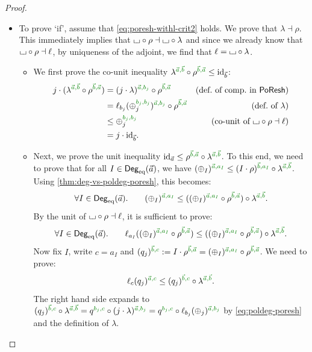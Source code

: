 \documentclass[a4paper]{memoir}
\begin{document}
\begin{proof}
\begin{enumerate}
\begin{itemize}
			\item To prove `if', assume that \cref{eq:poresh-withl-crit2} holds. We prove that $\lambda \dashv \rho$. This immediately implies that ${\llcorner\hspace{-.4ex}\lrcorner} \circ \rho \dashv {\llcorner\hspace{-.4ex}\lrcorner} \circ \lambda$ and since we already know that ${\llcorner\hspace{-.4ex}\lrcorner} \circ \rho \dashv \ell$, by uniqueness of the adjoint, we find that $\ell = {\llcorner\hspace{-.4ex}\lrcorner} \circ \lambda$.
			
			\begin{itemize}
				\item We first prove the co-unit inequality $\lambda \pmrhom{\vec a}{\vec b} \circ \rho \pmrhom{\vec b}{\vec a} \leq \id_{\vec b}$:
				\begin{align*}
					j \cdot (\lambda \pmrhom{\vec a}{\vec b} \circ \rho \pmrhom{\vec b}{\vec a})
					&= (j \cdot \lambda)\pmrhom{\vec a}{b_j} \circ \rho \pmrhom{\vec b}{\vec a}
					& \text{(def.\ of comp.\ in $\poreshcat$)}
					\\
					&= \ell_{b_j}(\pospol_j\pmrhom{b_j}{b_j})\pmrhom{\vec a}{b_j} \circ \rho \pmrhom{\vec b}{\vec a}
					& \text{(def.\ of $\lambda$)}
					\\
					&\leq \pospol_j\pmrhom{b_j}{b_j}
					& \text{(co-unit of $\loch \circ \rho \dashv \ell$)}
					\\
					&= j \cdot \id_{\vec b}.
				\end{align*}
				
				\item Next, we prove the unit inequality $\id_{\vec a} \leq \rho \pmrhom{\vec b}{\vec a} \circ \lambda \pmrhom{\vec a}{\vec b}$.
				To this end, we need to prove that for all $I \in {\mathsf{Deg}_{\mathrm{eq}}}(\vec a)$, we have $(\pospol_I)\pmrhom{\vec a}{a_I} \leq (I \cdot \rho)\pmrhom{\vec b}{a_I} \circ \lambda \pmrhom{\vec a}{\vec b}$.
				Using \cref{thm:deg-vs-poldeg-poresh}, this becomes:
				\[
					\forall I \in \Degeq(\vec a). \qquad
					(\pospol_I)\pmrhom{\vec a}{a_I}
					\leq
					((\pospol_I)\pmrhom{\vec a}{a_I} \circ \rho \pmrhom{\vec b}{\vec a}) \circ \lambda \pmrhom{\vec a}{\vec b}.
				\]
				By the unit of ${\llcorner\hspace{-.4ex}\lrcorner} \circ \rho \dashv \ell$, it is sufficient to prove:
				\[
					\forall I \in \Degeq(\vec a). \qquad
					\ell_{a_I}((\pospol_I)\pmrhom{\vec a}{a_I} \circ \rho \pmrhom{\vec b}{\vec a})
					\leq
					((\pospol_I)\pmrhom{\vec a}{a_I} \circ \rho \pmrhom{\vec b}{\vec a}) \circ \lambda \pmrhom{\vec a}{\vec b}.
				\]
				Now fix $I$, write $c = a_I$ and $(q_j)\pmrhom{\vec b}{c} := I \cdot \rho\pmrhom{\vec b}{\vec a} = (\pospol_I)\pmrhom{\vec a}{a_I} \circ \rho \pmrhom{\vec b}{\vec a}$.
				We need to prove:
				\[
					\ell_{c}(q_j)\pmrhom{\vec a}{c}
					\leq
					(q_j)\pmrhom{\vec b}{c} \circ \lambda \pmrhom{\vec a}{\vec b}.
				\]
				The right hand side expands to $(q_j)\pmrhom{\vec b}{c} \circ \lambda \pmrhom{\vec a}{\vec b} = q\pmrhom{b_j}{c} \circ (j \cdot \lambda)\pmrhom{\vec a}{b_j} = q\pmrhom{b_j}{c} \circ \ell_{b_j}(\pospol_j)\pmrhom{\vec a}{b_j}$ by \cref{eq:poldeg-poresh} and the definition of $\lambda$.
				

\end{itemize}
\end{itemize}
\end{enumerate}
\end{proof}
\end{document}

